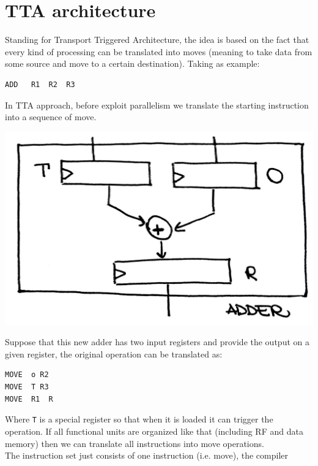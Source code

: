 \section{TTA architecture}
Standing for Transport Triggered Architecture, the idea is based on the fact
that every kind of processing can be translated into moves (meaning to take
data from some source and move to a certain destination). Taking as example:
\begin{verbatim}
ADD   R1  R2  R3
\end{verbatim}
In TTA approach, before exploit parallelism we translate the starting
instruction into a sequence of move.
\begin{center}
  \includegraphics[width=0.5\linewidth]{img/img3/7}
\end{center}
Suppose that this new adder has two input registers and provide the output on a
given register, the original operation can be translated as:
\begin{verbatim}
MOVE  o R2
MOVE  T R3
MOVE  R1  R
\end{verbatim}
Where \verb|T| is a special register so that when it is loaded it can trigger
the operation. If all functional units are organized like that (including RF
and data memory) then we can translate all instructions into move operations.\\
The instruction set just consists of one instruction (i.e. move), the compiler
